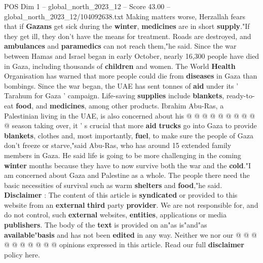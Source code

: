 \begin{textsample}{POS Dim 1 – global\_north\_2023\_12 – Score 43.00 – global\_north\_2023\_12/104092638.txt}
Making matters worse, Herzallah fears that if \textbf{Gazans} get sick during the \textbf{winter}, \textbf{medicines} are in short \textbf{supply}."If they get ill, they don't have the means for treatment.
Roads are destroyed, and \textbf{ambulances} and \textbf{paramedics} can not reach them,"he said.
Since the war between Hamas and Israel began in early October, nearly 16,300 people have died in Gaza, including thousands of \textbf{children} and women.
The World \textbf{Health} Organisation has warned that more people could die from \textbf{diseases} in Gaza than bombings.
Since the war began, the UAE has sent tonnes of \textbf{aid} under its ' Tarahum for Gaza ' campaign.
Life-saving \textbf{supplies} include \textbf{blankets}, ready-to-eat \textbf{food}, and \textbf{medicines}, among other products.
Ibrahim Abu-Ras, a Palestinian living in the UAE, is also concerned about his @ @ @ @ @ @ @ @ @ @ season taking over, it ' s crucial that more \textbf{aid} \textbf{trucks} go into Gaza to provide \textbf{blankets}, clothes and, most importantly, \textbf{fuel}, to make sure the people of Gaza don't freeze or starve,"said Abu-Ras, who has around 15 extended family members in Gaza.
He said life is going to be more challenging in the coming \textbf{winter} months because they have to now survive both the war and the \textbf{cold}."I am concerned about Gaza and Palestine as a whole.
The people there need the basic necessities of survival such as warm \textbf{shelters} and \textbf{food},"he said. \textbf{Disclaimer} : The content of this article is \textbf{syndicated} or provided to this website from an \textbf{external} \textbf{third} party \textbf{provider}.
We are not responsible for, and do not control, such \textbf{external} websites, \textbf{entities}, applications or media \textbf{publishers}.
The body of the \textbf{text} is provided on an"as is"and"as \textbf{available}"\textbf{basis} and has not been \textbf{edited} in any way.
Neither we nor our @ @ @ @ @ @ @ @ @ @ opinions expressed in this article.
Read our full \textbf{disclaimer} policy here.

\end{textsample}

